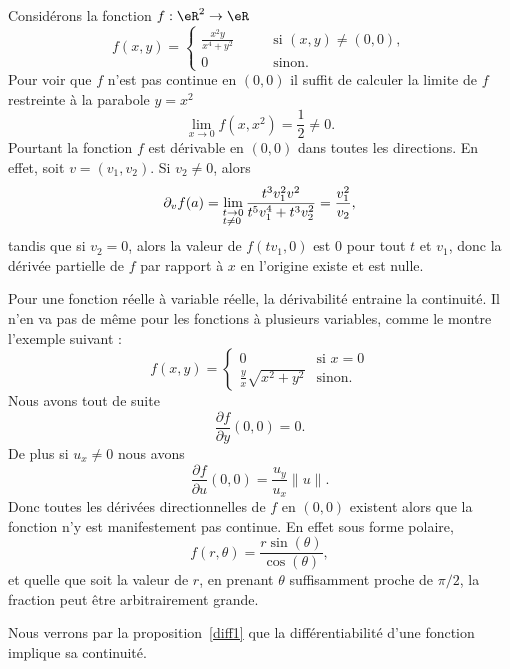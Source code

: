 \begin{example}
	Considérons la fonction \( f:\eR^2\to \eR\)
	\begin{equation}
		f(x,y)=\left\{
		\begin{array}{ll}
			\frac{x^2y}{x^4+y^2} \qquad & \textrm{si } (x,y)\neq (0,0), \\
			0                           & \textrm{sinon}.
		\end{array}
		\right.
	\end{equation}
	Pour voir que \( f\) n'est pas continue en \( (0,0)\) il suffit de calculer la limite de \( f\) restreinte à la parabole \( y=x^2\)
	\[
		\lim_{x\to 0} f(x,x^2)=\frac{1}{2} \neq 0.
	\]
	Pourtant la fonction \( f\) est dérivable en \( (0,0)\) dans toutes les directions. En effet, soit \( v=(v_1,v_2)\). Si \( v_2\neq 0\), alors
	\[
		\partial_v f(a)=\lim_{\begin{subarray}{l}
				t\to 0\\ t\neq 0
			\end{subarray}}
		\frac{t^3v_1^2v^2}{t^5 v_1^4+ t^3v_2^2}=\frac{v_1^2}{v_2},
	\]
	tandis que si \( v_2=0\), alors la valeur de \( f(tv_1, 0)\)  est \( 0\) pour tout \( t\) et \( v_1\), donc la dérivée partielle de \( f\) par rapport à \( x\) en l'origine existe et est nulle.
\end{example}

\begin{example}
	Pour une fonction réelle à variable réelle, la dérivabilité entraine la continuité. Il n'en va pas de même pour les fonctions à plusieurs variables, comme le montre l'exemple suivant :
	\begin{equation}
		f(x,y)=\begin{cases}
			0                             & \text{si } x=0 \\
			\frac{ y }{ x }\sqrt{x^2+y^2} & \text{sinon.}
		\end{cases}
	\end{equation}
	Nous avons tout de suite
	\begin{equation}
		\frac{ \partial f }{ \partial y }(0,0)=0.
	\end{equation}
	De plus si \( u_x\neq 0\) nous avons
	\begin{equation}
		\frac{ \partial f }{ \partial u }(0,0)=\frac{ u_y }{ u_x }\| u \|.
	\end{equation}
	Donc toutes les dérivées directionnelles de \( f\) en \( (0,0)\) existent alors que la fonction n'y est manifestement pas continue. En effet sous forme polaire,
	\begin{equation}
		f(r,\theta)=\frac{ r\sin(\theta) }{ \cos(\theta) },
	\end{equation}
	et quelle que soit la valeur de \( r\), en prenant \( \theta\) suffisamment proche de \( \pi/2\), la fraction peut être arbitrairement grande.

	Nous verrons par la proposition~\ref{diff1} que la différentiabilité d'une fonction implique sa continuité.
\end{example}

